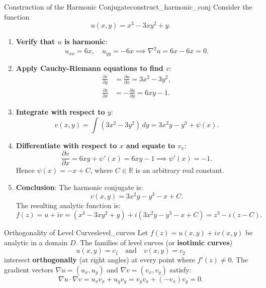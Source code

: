 \begin{example}{Construction of the Harmonic Conjugate}{construct_harmonic_conj}
Consider the function
\begin{equation}
u(x, y) = x^3 - 3xy^2 + y.
\end{equation}
\begin{enumerate}
    \item \textbf{Verify that $u$ is harmonic}:
    \begin{equation}
    u_{xx} = 6x, \quad u_{yy} = -6x \implies \nabla^2 u = 6x - 6x = 0.
    \end{equation}
    \item \textbf{Apply Cauchy-Riemann equations to find $v$}:
    \begin{align}
    \frac{\partial v}{\partial y} &= \frac{\partial u}{\partial x} = 3x^2 - 3y^2, \\
    \frac{\partial v}{\partial x} &= -\frac{\partial u}{\partial y} = 6xy - 1.
    \end{align}
    \item \textbf{Integrate with respect to $y$}:
    \begin{equation}
    v(x, y) = \int (3x^2 - 3y^2)\, dy = 3x^2 y - y^3 + \psi(x).
    \end{equation}
    \item \textbf{Differentiate with respect to $x$ and equate to $v_x$}:
    \begin{equation}
    \frac{\partial v}{\partial x} = 6xy + \psi'(x) = 6xy - 1 \implies \psi'(x) = -1.
    \end{equation}
    Hence $\psi(x) = -x + C$, where $C \in \mathbb{R}$ is an arbitrary real constant.
    \item \textbf{Conclusion}: The harmonic conjugate is:
    \begin{equation}
    v(x, y) = 3x^2 y - y^3 - x + C.
    \end{equation}
    The resulting analytic function is:
    \begin{equation}
    f(z) = u + iv = (x^3 - 3xy^2 + y) + i(3x^2 y - y^3 - x + C) = z^3 - i(z - C).
    \end{equation}
\end{enumerate}
\end{example}

\begin{proposition}{Orthogonality of Level Curves}{level_curves}
Let $f(z) = u(x, y) + i v(x, y)$ be analytic in a domain $D$. The families of level curves (or \textbf{isotimic curves})
\begin{equation}
u(x, y) = c_1 \quad \text{and} \quad v(x, y) = c_2
\end{equation}
intersect \textbf{orthogonally} (at right angles) at every point where $f'(z) \neq 0$.
The gradient vectors $\nabla u = (u_x, u_y)$ and $\nabla v = (v_x, v_y)$ satisfy:
\begin{equation}
\nabla u \cdot \nabla v = u_x v_x + u_y v_y = v_y v_x + (-v_x) v_y = 0.
\end{equation}
\end{proposition}

